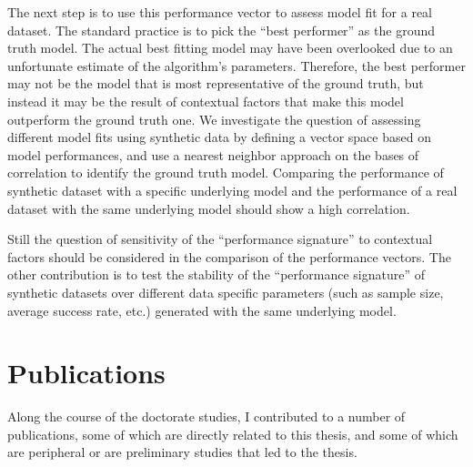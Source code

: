 The next step is to use this performance vector to assess model fit for a real dataset. The standard practice is to pick the ``best performer'' as the ground truth model. The actual best fitting model may have been overlooked due to an unfortunate estimate of the algorithm's parameters.  Therefore, the best performer may not be the model that is most representative of the ground truth, but instead it may be the result of contextual factors that make this model outperform the ground truth one. We investigate the question of assessing different model fits using synthetic data by defining a vector space based on model performances, and use a nearest neighbor approach on the bases of correlation to identify the ground truth model. Comparing the performance of synthetic dataset with a specific underlying model and the performance of a real dataset with the same underlying model should show a high correlation. 

Still the question of sensitivity of the ``performance signature'' to contextual factors should be considered in the comparison of the performance vectors. The other contribution is to test the stability of the ``performance signature'' of synthetic datasets over different data specific parameters (such as sample size, average success rate, etc.) generated with the same underlying model. 


\section{Publications}

Along the course of the doctorate studies, I contributed to a number of publications, some of which are directly related to this thesis, and some of which are peripheral or are preliminary studies that led to the thesis.

